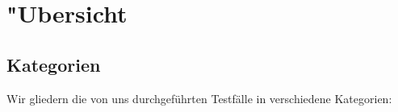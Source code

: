 %



\section{{"U}bersicht}
\label{Abschnitt:Tests:Uebersicht}



\subsection{Kategorien}
\label{Abschnitt:Tests:Uebersicht:Kategorien}

Wir gliedern die von uns durchgeführten Testfälle in verschiedene Kategorien:\\



